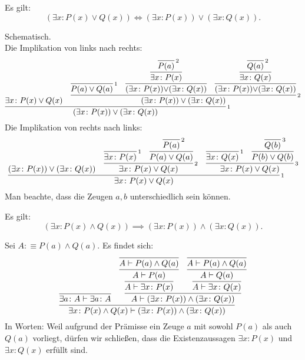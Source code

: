\begin{Satz}[Distributivgesetz]\label{exists-dl}
Es gilt:
\[(\exists x\colon P(x)\lor Q(x)) \iff
(\exists x\colon P(x))\lor(\exists x\colon Q(x)).\]
\end{Satz}
\begin{Beweis}[Beweis] Schematisch.\\
Die Implikation von links nach rechts:
\[
\infer[\infernote{1}]{(\exists x\colon P(x))\lor (\exists x\colon Q(x))}{
  \exists x\colon P(x)\lor Q(x)
& \infer[\infernote{2}]{(\exists x\colon P(x))\lor (\exists x\colon Q(x))}{
    \infer[\infernote{1}]{P(a)\lor Q(a)}{}
  & \infer{(\exists x\colon P(x)){\lor}(\exists x\colon Q(x))}{\infer{
      \exists x\colon P(x)}{\infer[\infernote{2}]{P(a)}{}}}
  & \infer{(\exists x\colon P(x)){\lor}(\exists x\colon Q(x))}{\infer{
      \exists x\colon Q(x)}{\infer[\infernote{2}]{Q(a)}{}}}}}
\]
Die Implikation von rechts nach links:
\[\infer[\infernote{1}]{\exists x\colon P(x)\lor Q(x)}{
  (\exists x\colon P(x))\lor(\exists x\colon Q(x))
  & \infer[\infernote{2}]{\exists x\colon P(x)\lor Q(x)}{
      \infer[\infernote{1}]{\exists x\colon P(x)}{}
      &
      \infer{P(a)\lor Q(a)}{
        \infer[\infernote{2}]{P(a)}{}}}
  & \infer[\infernote{3}]{\exists x\colon P(x)\lor Q(x)}{
      \infer[\infernote{1}]{\exists x\colon Q(x)}{}
      &
      \infer{P(b)\lor Q(b)}{
        \infer[\infernote{3}]{Q(b)}{}}}
}\]
Man beachte, dass die Zeugen $a,b$ unterschiedlich sein können.\,\qedsymbol
\end{Beweis}

\begin{Satz}\label{exists-asym-dl}
Es gilt:
\[(\exists x\colon P(x)\land Q(x)) \implies (\exists x\colon P(x))\land (\exists x\colon Q(x)).\]
\end{Satz}
\begin{Beweis}[Beweis] Sei $A:\equiv P(a)\land Q(a)$. Es findet sich:
\[
\infer{\exists x\colon P(x)\land Q(x)\vdash (\exists x\colon P(x))\land (\exists x\colon Q(x))}{
  \infer{\exists a\colon A\vdash\exists a\colon A}{}
& \infer{A\vdash (\exists x\colon P(x))\land (\exists x\colon Q(x))}{
    \infer{A\vdash\exists x\colon P(x)}{
      \infer{A\vdash P(a)}{\infer{A\vdash P(a)\land Q(a)}{}}}
  & \infer{A\vdash\exists x\colon Q(x)}{
       \infer{A\vdash Q(a)}{\infer{A\vdash P(a)\land Q(a)}{}}}}}
\]
In Worten: Weil aufgrund der Prämisse ein Zeuge $a$ mit sowohl $P(a)$
als auch $Q(a)$ vorliegt, dürfen wir schließen, dass die
Existenzaussagen $\exists x\colon P(x)$ und $\exists x\colon Q(x)$
erfüllt sind.\,\qedsymbol
\end{Beweis}

